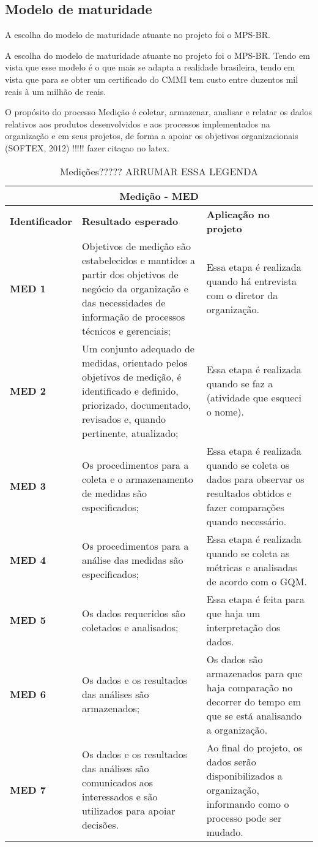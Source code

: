 \subsection{Modelo de maturidade}
	A escolha do modelo de maturidade atuante no projeto foi o MPS-BR.

  A escolha do modelo de maturidade atuante no projeto foi o MPS-BR. Tendo em vista que esse modelo é o que mais se adapta a realidade brasileira, tendo em vista que para se obter um certificado do CMMI  tem custo entre duzentos mil reais à um milhão de reais.

  O propósito do processo Medição é coletar, armazenar, analisar e relatar os dados relativos aos produtos desenvolvidos e aos processos implementados na organização e em seus projetos, de forma a apoiar os objetivos organizacionais (SOFTEX, 2012) !!!!! fazer citaçao no latex.

  \begin{table}[H]
  \centering
  \begin{tabular}{|p{3cm}|p{5cm}|p{3cm}|}
  \hline
    \multicolumn{3}{|c|}{\textbf{Medição - MED}} \\ \hline
    \textbf{Identificador} & \textbf{Resultado esperado} & \textbf{Aplicação no projeto} \\ \hline
    \textbf{MED 1} & Objetivos de medição são estabelecidos e mantidos a partir dos objetivos de negócio da organização e das necessidades de informação de processos técnicos e gerenciais; & Essa etapa é realizada quando há entrevista com o diretor da organização. \\ \hline
    \textbf{MED 2} & Um conjunto adequado de medidas, orientado pelos objetivos de medição, é identificado e definido, priorizado, documentado, revisados e, quando pertinente, atualizado; & Essa etapa é realizada quando se faz a (atividade que esqueci o nome). \\ \hline
    \textbf{MED 3} & Os procedimentos para a coleta e o armazenamento de medidas são especificados; & Essa etapa é realizada quando se coleta os dados para observar os resultados obtidos e fazer comparações quando necessário. \\ \hline
    \textbf{MED 4} & Os procedimentos para a análise das medidas são especificados; & Essa etapa é realizada quando se coleta as métricas e analisadas de acordo com o GQM. \\ \hline
    \textbf{MED 5} & Os dados requeridos são coletados e analisados; & Essa etapa é feita para que haja um interpretação dos dados. \\ \hline
    \textbf{MED 6} & Os dados e os resultados das análises são armazenados; & Os dados são armazenados para que haja comparação no decorrer do tempo em que se está analisando a organização. \\ \hline
    \textbf{MED 7} & Os dados e os resultados das análises são comunicados aos interessados e são utilizados para apoiar decisões. & Ao final do projeto, os dados serão disponibilizados a organização, informando como o processo pode ser mudado. \\ \hline
  \end{tabular}
  \caption{Medições????? ARRUMAR ESSA LEGENDA}
  \label{tab:medicoes}
  \end{table}
